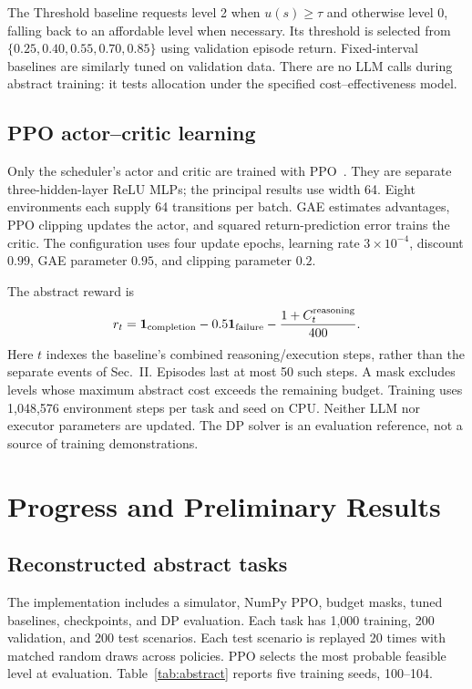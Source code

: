 \documentclass[conference]{IEEEtran}
\begin{document}
The Threshold baseline requests level 2 when $u(s)\ge\tau$ and otherwise level 0, falling back to an affordable level when necessary. Its threshold is selected from $\{0.25,0.40,0.55,0.70,0.85\}$ using validation episode return. Fixed-interval baselines are similarly tuned on validation data. There are no LLM calls during abstract training: it tests allocation under the specified cost--effectiveness model.

\subsection{PPO actor--critic learning}
Only the scheduler's actor and critic are trained with PPO~\cite{schulman2017ppo}. They are separate three-hidden-layer ReLU MLPs; the principal results use width 64. Eight environments each supply 64 transitions per batch. GAE estimates advantages, PPO clipping updates the actor, and squared return-prediction error trains the critic. The configuration uses four update epochs, learning rate $3\times10^{-4}$, discount $0.99$, GAE parameter $0.95$, and clipping parameter $0.2$.

The abstract reward is
\begin{equation}
 r_t=\mathbf{1}_{\rm completion}-0.5\mathbf{1}_{\rm failure}
 -\frac{1+C_t^{\rm reasoning}}{400}.
\end{equation}
Here $t$ indexes the baseline's combined reasoning/execution steps, rather than the separate events of Sec.~II. Episodes last at most 50 such steps. A mask excludes levels whose maximum abstract cost exceeds the remaining budget. Training uses 1,048,576 environment steps per task and seed on CPU. Neither LLM nor executor parameters are updated. The DP solver is an evaluation reference, not a source of training demonstrations.

\section{Progress and Preliminary Results}
\subsection{Reconstructed abstract tasks}
The implementation includes a simulator, NumPy PPO, budget masks, tuned baselines, checkpoints, and DP evaluation. Each task has 1,000 training, 200 validation, and 200 test scenarios. Each test scenario is replayed 20 times with matched random draws across policies. PPO selects the most probable feasible level at evaluation. Table~\ref{tab:abstract} reports five training seeds, 100--104.
\end{document}
